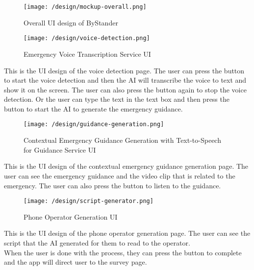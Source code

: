 \begin{figure}[h]
    \centering
    \texttt{[image: /design/mockup-overall.png]}
    \caption{Overall UI design of ByStander}
\end{figure}
\medskip %

\newpage
\begin{figure}[htbp]
    \centering
    \texttt{[image: /design/voice-detection.png]}
    \caption{Emergency Voice Transcription Service UI}
\end{figure}
This is the UI design of the voice detection page. The user can press the button to start the voice detection and then the AI will transcribe the voice to text and show it on the screen. The user can also press the button again to stop the voice detection.
Or the user can type the text in the text box and then press the button to start the AI to generate the emergency guidance.

\newpage
\begin{figure}[htbp]
    \centering
    \texttt{[image: /design/guidance-generation.png]}
    \caption{Contextual Emergency Guidance Generation with Text-to-Speech for Guidance Service UI}
\end{figure}
This is the UI design of the contextual emergency guidance generation page. The user can see the emergency guidance and the video clip that is related to the emergency. 
The user can also press the button to listen to the guidance.

\newpage
\begin{figure}[htbp]
    \centering
    \texttt{[image: /design/script-generator.png]}
    \caption{Phone Operator Generation UI}
\end{figure}
This is the UI design of the phone operator generation page. The user can see the script that the AI generated for them to read to the operator. \\
\indent When the user is done with the process, they can press the button to complete and the app will direct user to the survey page.